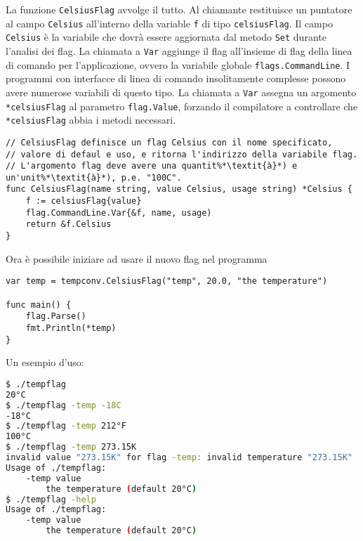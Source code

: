 \documentclass[../../thesis.tex]{subfiles}
\begin{document}
    La funzione \verb"CelsiusFlag" avvolge il tutto.
    Al chiamante restituisce un puntatore al campo \verb"Celsius" all'interno della variable \verb"f" di tipo \verb"celsiusFlag".
    Il campo \verb"Celsius" è la variabile che dovrà essere aggiornata dal metodo \verb"Set" durante l'analisi dei flag.
    La chiamata a \verb"Var" aggiunge il flag all'insieme di flag della linea di comando per l'applicazione, ovvero la variabile globale \verb"flags.CommandLine".
    I programmi con interfacce di linea di comando insolitamente complesse possono avere numerose variabili di questo tipo.
    La chiamata a \verb"Var" assegna un argomento \verb"*celsiusFlag" al parametro \verb"flag.Value", forzando il compilatore a controllare che \verb"*celsiusFlag" abbia i metodi necessari.
    \begin{lstlisting}[frame = single,label={lst:lstlisting6-4.6}]
// CelsiusFlag definisce un flag Celsius con il nome specificato,
// valore di defaul e uso, e ritorna l'indirizzo della variabile flag.
// L'argomento flag deve avere una quantit%*\textit{à}*) e un'unit%*\textit{à}*), p.e. "100C".
func CelsiusFlag(name string, value Celsius, usage string) *Celsius {
    f := celsiusFlag{value}
    flag.CommandLine.Var{&f, name, usage)
    return &f.Celsius
}
    \end{lstlisting}
    Ora è possibile iniziare ad usare il nuovo flag nel programma
    \begin{lstlisting}[frame = single,label={lst:lstlisting6-4.7}]
var temp = tempconv.CelsiusFlag("temp", 20.0, "the temperature")

func main() {
    flag.Parse()
    fmt.Println(*temp)
}
    \end{lstlisting}
    Un esempio d'uso:
    \begin{lstlisting}[language = bash, frame = L,label={lst:lstlisting6-4.8}]
$ ./tempflag
20°C
$ ./tempflag -temp -18C
-18°C
$ ./tempflag -temp 212°F
100°C
$ ./tempflag -temp 273.15K
invalid value "273.15K" for flag -temp: invalid temperature "273.15K"
Usage of ./tempflag:
    -temp value
        the temperature (default 20°C)
$ ./tempflag -help
Usage of ./tempflag:
    -temp value
        the temperature (default 20°C)
    \end{lstlisting}
\end{document}
